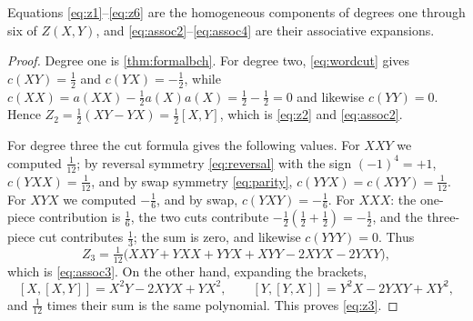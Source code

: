 \begin{proposition}\label{prop:lowdegree}
Equations \eqref{eq:z1}--\eqref{eq:z6} are the homogeneous components of
degrees one through six of $Z(X,Y)$, and \eqref{eq:assoc2}--\eqref{eq:assoc4}
are their associative expansions.
\end{proposition}
\begin{proof}
Degree one is \cref{thm:formalbch}. For degree two, \eqref{eq:wordcut}
gives $c(XY)=\tfrac12$ and $c(YX)=-\tfrac12$, while
$c(XX)=a(XX)-\tfrac12a(X)a(X)=\tfrac12-\tfrac12=0$ and likewise
$c(YY)=0$. Hence $Z_2=\tfrac12(XY-YX)=\tfrac12[X,Y]$, which is
\eqref{eq:z2} and \eqref{eq:assoc2}.

For degree three the cut formula gives the following values. For $XXY$ we
computed $\tfrac1{12}$; by reversal symmetry \eqref{eq:reversal} with the
sign $(-1)^{4}=+1$, $c(YXX)=\tfrac1{12}$, and by swap symmetry
\eqref{eq:parity}, $c(YYX)=c(XYY)=\tfrac1{12}$. For $XYX$ we computed
$-\tfrac16$, and by swap, $c(YXY)=-\tfrac16$. For $XXX$: the one-piece
contribution is $\tfrac16$, the two cuts contribute
$-\tfrac12(\tfrac12+\tfrac12)=-\tfrac12$, and the three-piece cut
contributes $\tfrac13$; the sum is zero, and likewise $c(YYY)=0$. Thus
\[
 Z_3=\tfrac1{12}\bigl(XXY+YXX+YYX+XYY-2XYX-2YXY\bigr),
\]
which is \eqref{eq:assoc3}. On the other hand, expanding the brackets,
\[
 [X,[X,Y]]=X^2Y-2XYX+YX^2,\qquad
 [Y,[Y,X]]=Y^2X-2YXY+XY^2,
\]
and $\tfrac1{12}$ times their sum is the same polynomial. This proves
\eqref{eq:z3}.


\end{proof}
